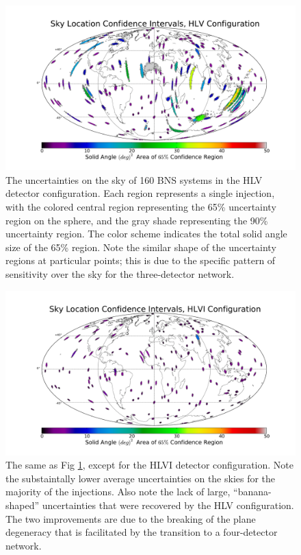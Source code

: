\documentclass[11pt,a4paper]{emulateapj} 
\begin{document}
\begin{figure}[ht!]
  \centering \includegraphics[angle=0,scale=0.4, trim=5cm 2cm 3cm
    0cm]{HLVsky.pdf}
 \caption{The uncertainties on the sky of 160 BNS systems in the HLV
   detector configuration.  Each region represents a single injection,
   with the colored central region representing the 65\% uncertainty
   region on the sphere, and the gray shade representing the 90\%
   uncertainty region.  The color scheme indicates the total solid
   angle size of the 65\% region.  Note the similar shape of the
   uncertainty regions at particular points; this is due to the
   specific pattern of sensitivity over the sky for the three-detector network.}
 \label{2525SkyLocHLV}
\end{figure}

\begin{figure}[ht!]
  \centering \includegraphics[angle=0,scale=0.4, trim=5cm 2cm 3cm
    0cm]{HLVIsky.pdf}
 \caption{The same as Fig \ref{2525SkyLocHLV}, except for the HLVI
   detector configuration.  Note the substaintally lower average
   uncertainties on the skies for the majority of the injections.
   Also note the lack of large, ``banana-shaped'' uncertainties that
   were recovered by the HLV configuration.  The two improvements are
   due to the breaking of the plane degeneracy that
   is facilitated by the transition to a four-detector network.}
 \label{2525SkyLocHLVI}
\end{figure}
  
\end{document}
